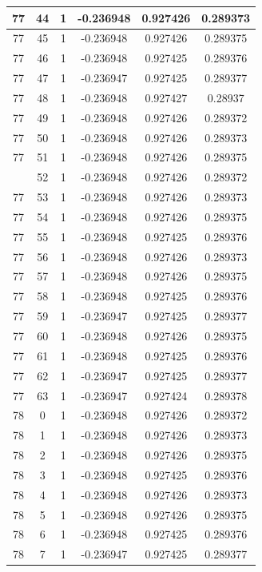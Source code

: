 \documentclass[12pt,a4paper]{article}
\numberwithin{equation}{section}
\numberwithin{figure}{section}
\numberwithin{table}{section}
\begin{document}
\begin{longtable}{|c|c|c|c|c|c|}
77 & 44 & 1 & -0.236948 & 0.927426 & 0.289373 \\ \hline
77 & 45 & 1 & -0.236948 & 0.927426 & 0.289375 \\ \hline
77 & 46 & 1 & -0.236948 & 0.927425 & 0.289376 \\ \hline
77 & 47 & 1 & -0.236947 & 0.927425 & 0.289377 \\ \hline
77 & 48 & 1 & -0.236948 & 0.927427 & 0.28937 \\ \hline
77 & 49 & 1 & -0.236948 & 0.927426 & 0.289372 \\ \hline
77 & 50 & 1 & -0.236948 & 0.927426 & 0.289373 \\ \hline
77 & 51 & 1 & -0.236948 & 0.927426 & 0.289375 \\ \hline
\pagebreak
77 & 52 & 1 & -0.236948 & 0.927426 & 0.289372 \\ \hline
77 & 53 & 1 & -0.236948 & 0.927426 & 0.289373 \\ \hline
77 & 54 & 1 & -0.236948 & 0.927426 & 0.289375 \\ \hline
77 & 55 & 1 & -0.236948 & 0.927425 & 0.289376 \\ \hline
77 & 56 & 1 & -0.236948 & 0.927426 & 0.289373 \\ \hline
77 & 57 & 1 & -0.236948 & 0.927426 & 0.289375 \\ \hline
77 & 58 & 1 & -0.236948 & 0.927425 & 0.289376 \\ \hline
77 & 59 & 1 & -0.236947 & 0.927425 & 0.289377 \\ \hline
77 & 60 & 1 & -0.236948 & 0.927426 & 0.289375 \\ \hline
77 & 61 & 1 & -0.236948 & 0.927425 & 0.289376 \\ \hline
77 & 62 & 1 & -0.236947 & 0.927425 & 0.289377 \\ \hline
77 & 63 & 1 & -0.236947 & 0.927424 & 0.289378 \\ \hline
78 & 0 & 1 & -0.236948 & 0.927426 & 0.289372 \\ \hline
78 & 1 & 1 & -0.236948 & 0.927426 & 0.289373 \\ \hline
78 & 2 & 1 & -0.236948 & 0.927426 & 0.289375 \\ \hline
78 & 3 & 1 & -0.236948 & 0.927425 & 0.289376 \\ \hline
78 & 4 & 1 & -0.236948 & 0.927426 & 0.289373 \\ \hline
78 & 5 & 1 & -0.236948 & 0.927426 & 0.289375 \\ \hline
78 & 6 & 1 & -0.236948 & 0.927425 & 0.289376 \\ \hline
78 & 7 & 1 & -0.236947 & 0.927425 & 0.289377 \\ \hline

\end{longtable}
\end{document}
